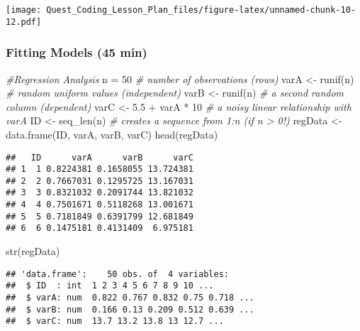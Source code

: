 \documentclass[
]{article}
\newenvironment{Shaded}{\begin{snugshade}}{\end{snugshade}}
\newcommand{\CommentTok}[1]{\textcolor[rgb]{0.56,0.35,0.01}{\textit{#1}}}
\newcommand{\DecValTok}[1]{\textcolor[rgb]{0.00,0.00,0.81}{#1}}
\newcommand{\FloatTok}[1]{\textcolor[rgb]{0.00,0.00,0.81}{#1}}
\newcommand{\FunctionTok}[1]{\textcolor[rgb]{0.00,0.00,0.00}{#1}}
\newcommand{\NormalTok}[1]{#1}
\newcommand{\OtherTok}[1]{\textcolor[rgb]{0.56,0.35,0.01}{#1}}
\newcommand{\SpecialCharTok}[1]{\textcolor[rgb]{0.00,0.00,0.00}{#1}}
\begin{document}
\texttt{[image: Quest\_Coding\_Lesson\_Plan\_files/figure-latex/unnamed-chunk-10-12.pdf]}

\hypertarget{fitting-models-45-min}{%
\subsubsection{Fitting Models (45 min)}\label{fitting-models-45-min}}

\begin{Shaded}
\begin{Highlighting}[]
\CommentTok{\#Regression Analysis}
\NormalTok{n }\OtherTok{=} \DecValTok{50}  \CommentTok{\# number of observations (rows)}
\NormalTok{varA }\OtherTok{\textless{}{-}} \FunctionTok{runif}\NormalTok{(n) }\CommentTok{\# random uniform values (independent)}
\NormalTok{varB }\OtherTok{\textless{}{-}} \FunctionTok{runif}\NormalTok{(n) }\CommentTok{\# a second random column (dependent)}
\NormalTok{varC }\OtherTok{\textless{}{-}} \FloatTok{5.5} \SpecialCharTok{+}\NormalTok{ varA }\SpecialCharTok{*} \DecValTok{10} \CommentTok{\# a noisy linear relationship with varA}
\NormalTok{ID }\OtherTok{\textless{}{-}} \FunctionTok{seq\_len}\NormalTok{(n) }\CommentTok{\# creates a sequence from 1:n (if n \textgreater{} 0!)}
\NormalTok{regData }\OtherTok{\textless{}{-}} \FunctionTok{data.frame}\NormalTok{(ID, varA, varB, varC)}
\FunctionTok{head}\NormalTok{(regData)}
\end{Highlighting}
\end{Shaded}

\begin{verbatim}
##   ID      varA      varB      varC
## 1  1 0.8224381 0.1658055 13.724381
## 2  2 0.7667031 0.1295725 13.167031
## 3  3 0.8321032 0.2091744 13.821032
## 4  4 0.7501671 0.5118268 13.001671
## 5  5 0.7181849 0.6391799 12.681849
## 6  6 0.1475181 0.4131409  6.975181
\end{verbatim}

\begin{Shaded}
\begin{Highlighting}[]
\FunctionTok{str}\NormalTok{(regData)}
\end{Highlighting}
\end{Shaded}

\begin{verbatim}
## 'data.frame':    50 obs. of  4 variables:
##  $ ID  : int  1 2 3 4 5 6 7 8 9 10 ...
##  $ varA: num  0.822 0.767 0.832 0.75 0.718 ...
##  $ varB: num  0.166 0.13 0.209 0.512 0.639 ...
##  $ varC: num  13.7 13.2 13.8 13 12.7 ...
\end{verbatim}
\end{document}
